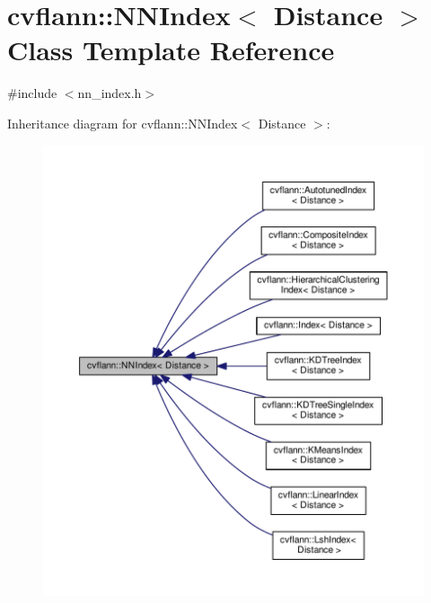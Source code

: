 \hypertarget{classcvflann_1_1NNIndex}{\section{cvflann\-:\-:N\-N\-Index$<$ Distance $>$ Class Template Reference}
\label{classcvflann_1_1NNIndex}
}


{\ttfamily \#include $<$nn\-\_\-index.\-h$>$}



Inheritance diagram for cvflann\-:\-:N\-N\-Index$<$ Distance $>$\-:\nopagebreak
\begin{figure}[H]
\begin{center}
\leavevmode
\includegraphics[width=350pt]{classcvflann_1_1NNIndex__inherit__graph}
\end{center}
\end{figure}
